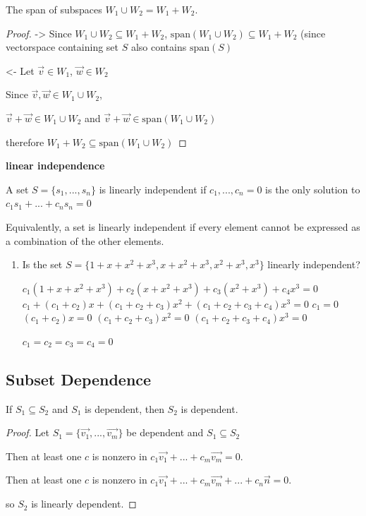 \documentclass[11pt]{article}
\begin{document}
\begin{theorem}
The span of subspaces \(W_1 \cup W_2 = W_1 + W_2\).
\end{theorem}
\begin{proof}
-> Since \(W_1 \cup W_2 \subseteq W_1 + W_2\), \(\text{span} (W_1 \cup W_2) \subseteq W_1 + W_2\) (since vectorspace containing set \(S\) also contains \(\text{span} (S)\)

<- Let \(\overrightarrow{v} \in W_1\), \(\overrightarrow{w} \in W_2\)

Since \(\overrightarrow{v}, \overrightarrow{w} \in W_1 \cup W_2\), 

\(\overrightarrow{v} + \overrightarrow{w} \in W_1 \cup W_2\) and \(\overrightarrow{v} + \overrightarrow{w} \in \text{span} (W_1 \cup W_2)\)

therefore \(W_1 + W_2 \subseteq \text{span} (W_1 \cup W_2)\)
\end{proof}

\begin{definition}
\textbf{linear independence}

A set \(S = \{s_1, ..., s_n\}\) is linearly independent if \(c_1, ..., c_n = 0\) is the only solution to \(c_1 s_1 + ... + c_n s_n = 0\)

Equivalently, a set is linearly independent if every element cannot be expressed as a combination of the other elements.
\end{definition}

\begin{examples}
\begin{enumerate}
\item Is the set \(S = \{1 + x + x^2 + x^3, x + x^2 + x^3, x^2 + x^3, x^3\}\) linearly independent?

\(c_1(1 + x + x^2 + x^3) + c_2 ( x + x^2 + x^3) + c_3 ( x^2 + x^3) + c_4 x^3 = 0\)
\(c_1 + (c_1 + c_2)x + (c_1 + c_2 + c_3)x^2 + (c_1 + c_2 + c_3 + c_4)x^3 = 0\)
\(c_1 = 0\)
\((c_1 + c_2)x = 0\)
\((c_1 + c_2 + c_3)x^2 = 0\)
\((c_1 + c_2 + c_3 + c_4)x^3 = 0\)

\(c_1 = c_2 = c_3 = c_4 = 0\)
\end{enumerate}
\end{examples}

\subsection{Subset Dependence}
\label{sec:orgheadline4}
\begin{theorem}
If \(S_1 \subseteq S_2\) and \(S_1\) is dependent, then \(S_2\) is dependent.
\end{theorem}
\begin{proof}
Let \(S_1 = \{\overrightarrow{v_1}, ...,\overrightarrow{v_m}\}\) be dependent and \(S_1 \subseteq S_2\)

Then at least one \(c\) is nonzero in \(c_1 \overrightarrow{v_1} + ... + c_m \overrightarrow{v_m} = 0\).

Then at least one \(c\) is nonzero in \(c_1 \overrightarrow{v_1} + ... + c_m \overrightarrow{v_m} + ... + c_n \overrightarrow{n} = 0\).

so \(S_2\) is linearly dependent.
\end{proof}
\end{document}
